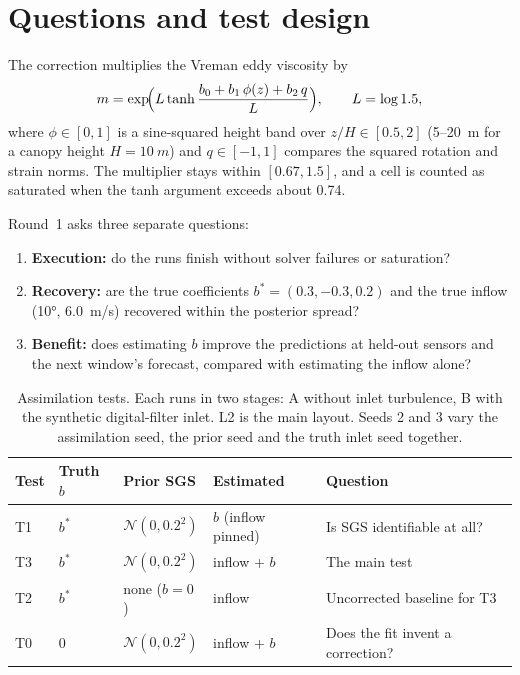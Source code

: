 \documentclass[11pt,a4paper]{article}
\newcommand{\bstar}{\ensuremath{b^\ast}}
\begin{document}
\section{Questions and test design}

The correction multiplies the Vreman eddy viscosity by
\begin{equation}
  m = \exp\!\Bigl(L \tanh\frac{b_0 + b_1\,\phi(z) + b_2\,q}{L}\Bigr),
  \qquad L = \log 1.5,
  \label{eq:multiplier}
\end{equation}
where $\phi\in[0,1]$ is a sine-squared height band over
$z/H\in[0.5,2]$ (5--\SI{20}{m} for a canopy height $H=\SI{10}{m}$) and
$q\in[-1,1]$ compares the squared rotation and strain norms. The multiplier
stays within $[0.67,1.5]$, and a cell is counted as saturated when the tanh
argument exceeds about 0.74.

Round~1 asks three separate questions:
\begin{enumerate}
\item \textbf{Execution:} do the runs finish without solver failures or
  saturation?
\item \textbf{Recovery:} are the true coefficients
  $\bstar=(0.3,-0.3,0.2)$ and the true inflow (\ang{10},
  \SI{6.0}{m/s}) recovered within the posterior spread?
\item \textbf{Benefit:} does estimating $b$ improve the predictions at
  held-out sensors and the next window's forecast, compared with estimating
  the inflow alone?
\end{enumerate}

\begin{table}[!htbp]
\centering\small
\caption{Assimilation tests. Each runs in two stages: A without inlet
turbulence, B with the synthetic digital-filter inlet. L2 is the main
layout. Seeds 2 and 3 vary the assimilation seed, the prior seed and the
truth inlet seed together.}
\label{tab:tests}
\begin{tabularx}{\linewidth}{@{}llllX@{}}
\toprule
Test & Truth $b$ & Prior SGS & Estimated & Question \\
\midrule
T1 & \bstar & $\mathcal N(0,0.2^2)$ & $b$ (inflow pinned) & Is SGS identifiable at all? \\
T3 & \bstar & $\mathcal N(0,0.2^2)$ & inflow + $b$ & The main test \\
T2 & \bstar & none ($b=0$) & inflow & Uncorrected baseline for T3 \\
T0 & 0 & $\mathcal N(0,0.2^2)$ & inflow + $b$ & Does the fit invent a correction? \\
\bottomrule
\end{tabularx}
\end{table}
\end{document}
